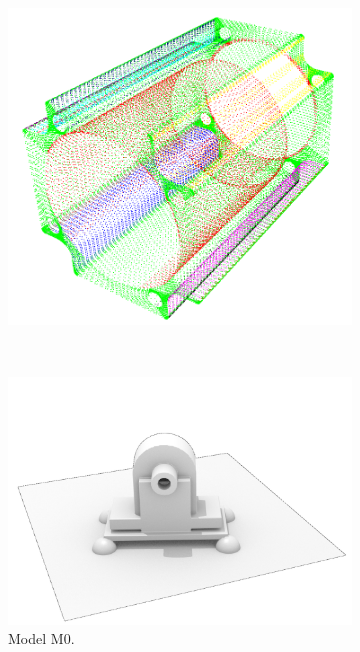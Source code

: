 \begin{figure}
\begin{subfigure}[b]{0.3\linewidth}
		\includegraphics[width=\textwidth]{figures/m3_pc.png}
	\end{subfigure}	 
	\\
	\begin{subfigure}[b]{0.30\linewidth}
		\centering
		\includegraphics[width=\textwidth]{figures/m0_rendering_wo.png}
		\caption{Model M$0$.}
	\end{subfigure}	 
	\begin{subfigure}[b]{0.3\linewidth}
		\centering

\end{subfigure}
\end{figure}
